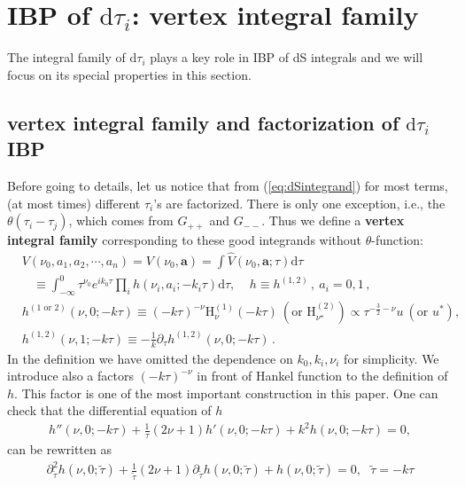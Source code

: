\documentclass[a4paper,11pt]{article}
\newcommand{\nn}{\nonumber}
\newcommand{\nd}{\mathrm{d}}
\def\eqref#1{(\ref{#1})}
\begin{document}
\section{IBP of $\nd\tau_i$: vertex integral family}\label{sec:3}

The integral family of $\nd \tau_i$ plays a key role in IBP of dS integrals and we will focus on its special properties in this section. 


\subsection{vertex integral family and factorization of $\nd \tau_i$ IBP} \label{sec:3.1}

Before going to details, let us notice that from \eqref{eq:dSintegrand}  for most terms, (at most times) different $\tau_i$'s are factorized. There is only one exception, i.e., the $\theta(\tau_i-\tau_j)$, which comes from $G_{++}$ and $G_{--}$. Thus we  define a \textbf{vertex integral family} corresponding to these good integrands without $\theta$-function: 
\begin{align}
&V(\nu_0,a_1,a_2,\cdots,a_n)= V(\nu_0,\bm{a})=\int  \hat{V}(\nu_0,\bm{a};\tau) \nd\tau \nn\\
&~~~~\equiv\int_{-\infty}^0 \tau^{\nu_0} e^{ik_0 \tau} 
 \prod_i h(\nu_i,a_i;-k_i\tau)\nd \tau ,~~~~~ h\equiv h^{(1,2)} \, , \ a_i=0,1 \, , \nn\\
 &h^{(1\text{ or }2)}(\nu,0;-k\tau)\equiv  (-k\tau)^{-\nu} \text{H}_{\nu}^{(1)}(-k \tau) ~ (\text{or }\text{H}_{\nu^\star}^{(2)} )\propto \tau^{-\frac{3}{2}-\nu} u ~ (\text{or } u^*),\nn\\
& h^{(1,2)}(\nu,1;-k\tau)\equiv - \frac{1}{k} \partial_\tau h^{(1,2)}(\nu,0;-k\tau)  \, .
\label{eq:vtxfamily}
\end{align}
In the definition we have omitted the dependence on  $k_0,k_i,\nu_i$ for simplicity. 
We introduce also a factors $(-k\tau)^{-\nu}$ in front of Hankel function to the definition of $h$. This factor is one of the most important construction in this paper.  One can check that   the differential equation of $h$ 
\begin{align}
  h''(\nu,0;-k\tau)+\frac{1}{\tau}(2\nu+1)h'(\nu,0;-k\tau)+k^2 h(\nu,0;-k\tau)=0, \label{eq:eom1}
\end{align}
can be rewritten as
\begin{align}
 \partial_{\tilde{\tau}}^2 h(\nu,0;\tilde{\tau})+\frac{1}{\tilde{\tau}}(2\nu+1)\partial_{\tilde{\tau}}h(\nu,0;\tilde{\tau})+ h(\nu,0;\tilde{\tau})=0, ~~~\tilde{\tau}=-k\tau\label{eq:eom2}
\end{align}
\end{document}

